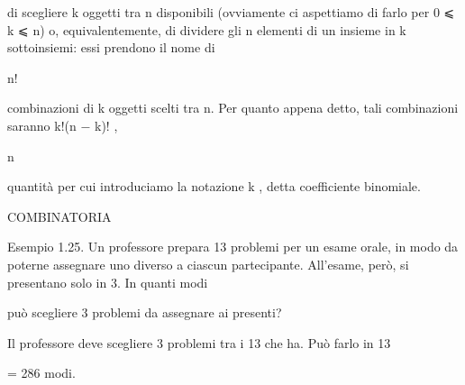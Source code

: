 \documentclass[a4paper,portrait,12pt]{article}
\begin{document}
\begin{flushleft}
di scegliere k oggetti tra n disponibili (ovviamente ci aspettiamo di farlo per 0 ⩽ k ⩽ n) o, equivalentemente, di dividere gli n elementi di un insieme in k sottoinsiemi: essi prendono il nome di
\end{flushleft}


\begin{flushleft}
n!
\end{flushleft}


\begin{flushleft}
combinazioni di k oggetti scelti tra n. Per quanto appena detto, tali combinazioni saranno k!(n $-$ k)! ,
\end{flushleft}


\begin{flushleft}
n
\end{flushleft}


\begin{flushleft}
quantit\`{a} per cui introduciamo la notazione k , detta coefficiente binomiale.
\end{flushleft}










\begin{flushleft}
COMBINATORIA
\end{flushleft}





\begin{flushleft}
Esempio 1.25. Un professore prepara 13 problemi per un esame orale, in modo da poterne assegnare uno diverso a ciascun partecipante. All'esame, per\`{o}, si presentano solo in 3. In quanti modi
\end{flushleft}


\begin{flushleft}
pu\`{o} scegliere 3 problemi da assegnare ai presenti?
\end{flushleft}


\begin{flushleft}
Il professore deve scegliere 3 problemi tra i 13 che ha. Pu\`{o} farlo in 13
\end{flushleft}


\begin{flushleft}
= 286 modi.
\end{flushleft}
\end{document}
